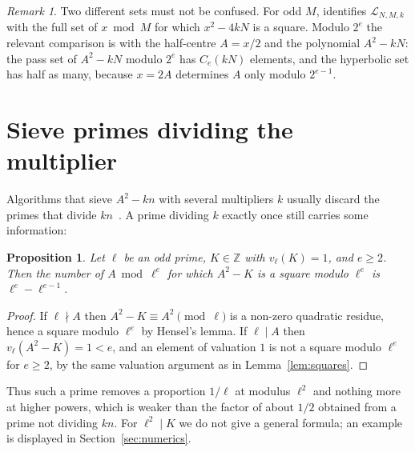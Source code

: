 \documentclass[11pt]{amsart}
\newtheorem{proposition}[theorem]{Proposition}
\theoremstyle{remark}
\newtheorem{remark}[theorem]{Remark}
\newcommand{\Z}{\mathbb{Z}}
\newcommand{\Lset}{\mathcal{L}}
\begin{document}
\begin{remark}
Two different sets must not be confused. For odd $M$, \cite[Lemma~4.2]{hittmeir2023} identifies $\Lset_{N,M,k}$ with the full set of $x\bmod M$ for which $x^2-4kN$ is a square. Modulo $2^e$ the relevant comparison is with the half-centre $A=x/2$ and the polynomial $A^2-kN$: the pass set of $A^2-kN$ modulo $2^e$ has $C_e(kN)$ elements, and the hyperbolic set has half as many, because $x=2A$ determines $A$ only modulo $2^{e-1}$.
\end{remark}

\section{Sieve primes dividing the multiplier}

Algorithms that sieve $A^2-kn$ with several multipliers $k$ usually discard the primes that divide $kn$~\cite[Algorithm~4.3]{hittmeir2023}. A prime dividing $k$ exactly once still carries some information:

\begin{proposition}\label{prop:divk}
Let $\ell$ be an odd prime, $K\in\Z$ with $v_\ell(K)=1$, and $e\ge2$. Then the number of $A\bmod\ell^e$ for which $A^2-K$ is a square modulo $\ell^e$ is $\ell^e-\ell^{e-1}$.
\end{proposition}

\begin{proof}
If $\ell\nmid A$ then $A^2-K\equiv A^2\pmod\ell$ is a non-zero quadratic residue, hence a square modulo $\ell^e$ by Hensel's lemma. If $\ell\mid A$ then $v_\ell(A^2-K)=1<e$, and an element of valuation $1$ is not a square modulo $\ell^e$ for $e\ge2$, by the same valuation argument as in Lemma~\ref{lem:squares}.
\end{proof}

Thus such a prime removes a proportion $1/\ell$ at modulus $\ell^2$ and nothing more at higher powers, which is weaker than the factor of about $1/2$ obtained from a prime not dividing $kn$. For $\ell^2\mid K$ we do not give a general formula; an example is displayed in Section~\ref{sec:numerics}.
\end{document}
